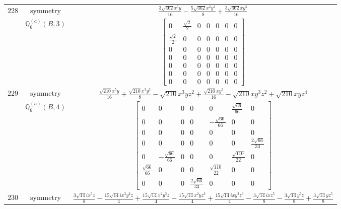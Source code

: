 \documentclass[fleqn,8pt,landscape]{jsarticle}
\begin{document}
\begin{longtable}{ccc}
$ 228 $ & $ \text{symmetry} $ & $ \frac{3 \sqrt{462} x^{5} y}{16} - \frac{5 \sqrt{462} x^{3} y^{3}}{8} + \frac{3 \sqrt{462} x y^{5}}{16} $ \\
$  $ & $ \mathbb{Q}_{6}^{(a)}(B,3) $ & $ \begin{bmatrix} 0 & \frac{\sqrt{2}}{2} & 0 & 0 & 0 & 0 & 0 \\ \frac{\sqrt{2}}{2} & 0 & 0 & 0 & 0 & 0 & 0 \\ 0 & 0 & 0 & 0 & 0 & 0 & 0 \\ 0 & 0 & 0 & 0 & 0 & 0 & 0 \\ 0 & 0 & 0 & 0 & 0 & 0 & 0 \\ 0 & 0 & 0 & 0 & 0 & 0 & 0 \\ 0 & 0 & 0 & 0 & 0 & 0 & 0 \end{bmatrix} $ \\ \hline
$ 229 $ & $ \text{symmetry} $ & $ \frac{\sqrt{210} x^{5} y}{16} + \frac{\sqrt{210} x^{3} y^{3}}{8} - \sqrt{210} x^{3} y z^{2} + \frac{\sqrt{210} x y^{5}}{16} - \sqrt{210} x y^{3} z^{2} + \sqrt{210} x y z^{4} $ \\
$  $ & $ \mathbb{Q}_{6}^{(a)}(B,4) $ & $ \begin{bmatrix} 0 & 0 & 0 & 0 & 0 & \frac{\sqrt{66}}{66} & 0 \\ 0 & 0 & 0 & 0 & - \frac{\sqrt{66}}{66} & 0 & 0 \\ 0 & 0 & 0 & 0 & 0 & 0 & 0 \\ 0 & 0 & 0 & 0 & 0 & 0 & \frac{2 \sqrt{66}}{33} \\ 0 & - \frac{\sqrt{66}}{66} & 0 & 0 & 0 & \frac{\sqrt{110}}{22} & 0 \\ \frac{\sqrt{66}}{66} & 0 & 0 & 0 & \frac{\sqrt{110}}{22} & 0 & 0 \\ 0 & 0 & 0 & \frac{2 \sqrt{66}}{33} & 0 & 0 & 0 \end{bmatrix} $ \\ \hline
$ 230 $ & $ \text{symmetry} $ & $ \frac{3 \sqrt{14} i x^{5} z}{8} - \frac{15 \sqrt{14} i x^{3} y^{2} z}{4} + \frac{15 \sqrt{14} x^{2} y^{3} z}{4} - \frac{15 \sqrt{14} x^{2} y z^{3}}{4} + \frac{15 \sqrt{14} i x y^{2} z^{3}}{4} - \frac{3 \sqrt{14} i x z^{5}}{8} - \frac{3 \sqrt{14} y^{5} z}{8} + \frac{3 \sqrt{14} y z^{5}}{8} $ \\

\end{longtable}
\end{document}

